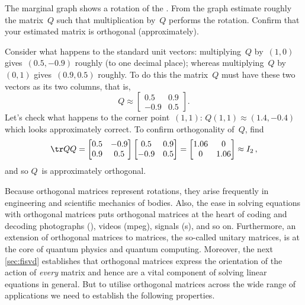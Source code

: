 \begin{example} \label{eg:introt}
The marginal graph shows a rotation of the . 
\def\unithousesize{footnotesize,grid} 
%
From the graph estimate roughly the matrix~\(Q\) such that multiplication by~\(Q\) performs the rotation. 
Confirm that your estimated matrix is orthogonal (approximately).
\begin{solution} 
Consider what happens to the standard unit vectors:  multiplying~\(Q\) by~\((1,0)\) gives~\((0.5,-0.9)\) roughly (to one decimal place); whereas multiplying~\(Q\) by~\((0,1)\) gives~\((0.9,0.5)\) roughly.
To do this the matrix~\(Q\) must have these two vectors as its two columns, that is,
\begin{equation*}
Q\approx\begin{bmatrix} 0.5&0.9\\-0.9&0.5 \end{bmatrix}.
\end{equation*}
Let's check what happens to the corner point~\((1,1)\): \(Q(1,1)\approx (1.4,-0.4)\) which looks approximately correct.
To confirm orthogonality of~\(Q\), find
\begin{equation*}
\tr QQ=\begin{bmatrix} 0.5&-0.9\\0.9&0.5 \end{bmatrix}
\begin{bmatrix} 0.5&0.9\\-0.9&0.5 \end{bmatrix}
=\begin{bmatrix} 1.06&0\\0&1.06 \end{bmatrix}\approx I_2\,,
\end{equation*}
and so \(Q\)~is approximately orthogonal.
\end{solution}
\end{example}


Because orthogonal matrices represent rotations, they arise frequently in engineering and scientific mechanics of bodies.
Also, the ease in solving equations with orthogonal matrices puts orthogonal matrices at the heart of coding and decoding photographs (), videos (mpeg), signals (s), and so on.
Furthermore, an extension of orthogonal matrices to  matrices, the so-called unitary matrices, is at the core of quantum physics and quantum computing.
Moreover, the next \autoref{sec:fisvd} establishes that orthogonal matrices express the orientation of the action of \emph{every} matrix and hence are a vital component of solving linear equations in general.
But to utilise orthogonal matrices across the wide range of applications we need to establish the following properties.




